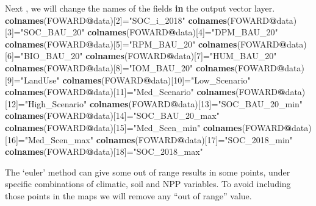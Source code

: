 \documentclass[
  10pt,
  b5paper,
]{book}
\newenvironment{Shaded}{\begin{snugshade}}{\end{snugshade}}
\newcommand{\ControlFlowTok}[1]{\textcolor[rgb]{0.13,0.29,0.53}{\textbf{#1}}}
\newcommand{\DecValTok}[1]{\textcolor[rgb]{0.00,0.00,0.81}{#1}}
\newcommand{\KeywordTok}[1]{\textcolor[rgb]{0.13,0.29,0.53}{\textbf{#1}}}
\newcommand{\NormalTok}[1]{#1}
\newcommand{\OperatorTok}[1]{\textcolor[rgb]{0.81,0.36,0.00}{\textbf{#1}}}
\newcommand{\StringTok}[1]{\textcolor[rgb]{0.31,0.60,0.02}{#1}}
\begin{document}
\begin{Shaded}
\begin{Highlighting}[]
\NormalTok{Next , we will change the names of the fields }\ControlFlowTok{in}\NormalTok{ the output vector layer.}
\KeywordTok{colnames}\NormalTok{(FOWARD}\OperatorTok{@}\NormalTok{data)[}\DecValTok{2}\NormalTok{]=}\StringTok{"SOC_i_2018"}
\KeywordTok{colnames}\NormalTok{(FOWARD}\OperatorTok{@}\NormalTok{data)[}\DecValTok{3}\NormalTok{]=}\StringTok{"SOC_BAU_20"}
\KeywordTok{colnames}\NormalTok{(FOWARD}\OperatorTok{@}\NormalTok{data)[}\DecValTok{4}\NormalTok{]=}\StringTok{"DPM_BAU_20"}
\KeywordTok{colnames}\NormalTok{(FOWARD}\OperatorTok{@}\NormalTok{data)[}\DecValTok{5}\NormalTok{]=}\StringTok{"RPM_BAU_20"}
\KeywordTok{colnames}\NormalTok{(FOWARD}\OperatorTok{@}\NormalTok{data)[}\DecValTok{6}\NormalTok{]=}\StringTok{"BIO_BAU_20"}
\KeywordTok{colnames}\NormalTok{(FOWARD}\OperatorTok{@}\NormalTok{data)[}\DecValTok{7}\NormalTok{]=}\StringTok{"HUM_BAU_20"}
\KeywordTok{colnames}\NormalTok{(FOWARD}\OperatorTok{@}\NormalTok{data)[}\DecValTok{8}\NormalTok{]=}\StringTok{"IOM_BAU_20"}
\KeywordTok{colnames}\NormalTok{(FOWARD}\OperatorTok{@}\NormalTok{data)[}\DecValTok{9}\NormalTok{]=}\StringTok{"LandUse"}
\KeywordTok{colnames}\NormalTok{(FOWARD}\OperatorTok{@}\NormalTok{data)[}\DecValTok{10}\NormalTok{]=}\StringTok{"Low_Scenario"}
\KeywordTok{colnames}\NormalTok{(FOWARD}\OperatorTok{@}\NormalTok{data)[}\DecValTok{11}\NormalTok{]=}\StringTok{"Med_Scenario"}
\KeywordTok{colnames}\NormalTok{(FOWARD}\OperatorTok{@}\NormalTok{data)[}\DecValTok{12}\NormalTok{]=}\StringTok{"High_Scenario"}
\KeywordTok{colnames}\NormalTok{(FOWARD}\OperatorTok{@}\NormalTok{data)[}\DecValTok{13}\NormalTok{]=}\StringTok{"SOC_BAU_20_min"}
\KeywordTok{colnames}\NormalTok{(FOWARD}\OperatorTok{@}\NormalTok{data)[}\DecValTok{14}\NormalTok{]=}\StringTok{"SOC_BAU_20_max"}
\KeywordTok{colnames}\NormalTok{(FOWARD}\OperatorTok{@}\NormalTok{data)[}\DecValTok{15}\NormalTok{]=}\StringTok{"Med_Scen_min"}
\KeywordTok{colnames}\NormalTok{(FOWARD}\OperatorTok{@}\NormalTok{data)[}\DecValTok{16}\NormalTok{]=}\StringTok{"Med_Scen_max"}
\KeywordTok{colnames}\NormalTok{(FOWARD}\OperatorTok{@}\NormalTok{data)[}\DecValTok{17}\NormalTok{]=}\StringTok{"SOC_2018_min"}
\KeywordTok{colnames}\NormalTok{(FOWARD}\OperatorTok{@}\NormalTok{data)[}\DecValTok{18}\NormalTok{]=}\StringTok{"SOC_2018_max"}
\end{Highlighting}
\end{Shaded}

The `euler' method can give some out of range results in some points, under specific combinations of climatic, soil and NPP variables. To avoid including those points in the maps we will remove any ``out of range'' value.
\end{document}
